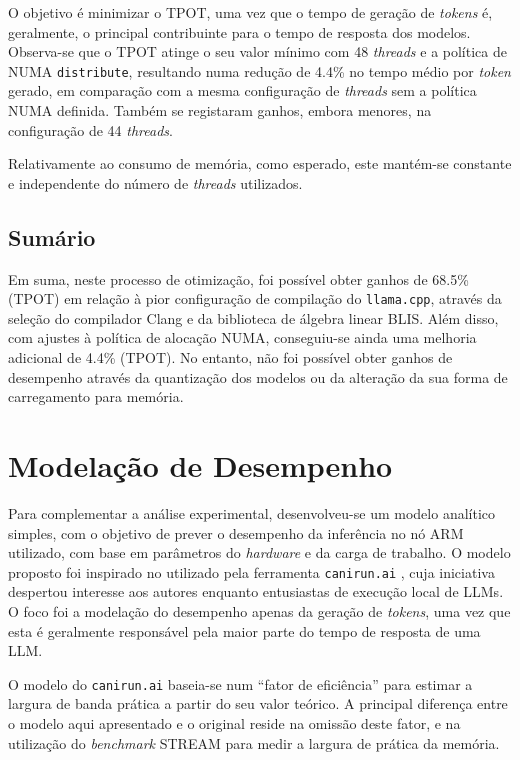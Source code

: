 \documentclass[11pt, a4paper]{article}
\begin{document}
O objetivo é minimizar o TPOT, uma vez que o tempo de geração de \emph{tokens} é, geralmente, o
principal contribuinte para o tempo de resposta dos modelos. Observa-se que o TPOT atinge o seu
valor mínimo com 48 \emph{threads} e a política de NUMA \texttt{distribute}, resultando numa redução
de 4.4\% no tempo médio por \emph{token} gerado, em comparação com a mesma configuração de
\emph{threads} sem a política NUMA definida. Também se registaram ganhos, embora menores, na
configuração de 44 \emph{threads}.

Relativamente ao consumo de memória, como esperado, este mantém-se constante e independente do
número de \emph{threads} utilizados.

\subsection{Sumário}

Em suma, neste processo de otimização, foi possível obter ganhos de 68.5\% (TPOT) em relação à pior
configuração de compilação do \texttt{llama.cpp}, através da seleção do compilador Clang e da
biblioteca de álgebra linear BLIS. Além disso, com ajustes à política de alocação NUMA, conseguiu-se
ainda uma melhoria adicional de 4.4\% (TPOT). No entanto, não foi possível obter ganhos de
desempenho através da quantização dos modelos ou da alteração da sua forma de carregamento para
memória.

\section{Modelação de Desempenho} %

Para complementar a análise experimental, desenvolveu-se um modelo analítico simples, com o objetivo
de prever o desempenho da inferência no nó ARM utilizado, com base em parâmetros do \emph{hardware}
e da carga de trabalho. O modelo proposto foi inspirado no utilizado pela ferramenta
\texttt{canirun.ai} \cite{can-i-run}, cuja iniciativa despertou interesse aos autores enquanto
entusiastas de execução local de LLMs. O foco foi a modelação do desempenho apenas da geração de
\emph{tokens}, uma vez que esta é geralmente responsável pela maior parte do tempo de resposta de
uma LLM.

O modelo do \texttt{canirun.ai} baseia-se num ``fator de eficiência'' para estimar a largura de 
banda prática a partir do seu valor teórico. A principal diferença entre o modelo aqui apresentado e
o original reside na omissão deste fator, e na utilização do \emph{benchmark} STREAM \cite{stream}
para medir a largura de prática da memória.
\end{document}
